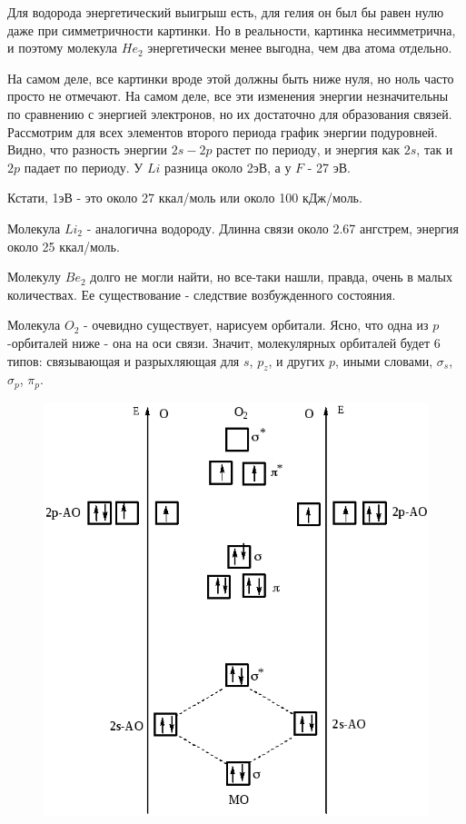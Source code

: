 \documentclass[11pt]{article}
\begin{document}
Для водорода энергетический выигрыш есть, для гелия он был бы равен нулю даже при симметричности картинки. Но в реальности, картинка несимметрична, и поэтому молекула $He_2$ энергетически менее выгодна, чем два атома отдельно.

На самом деле, все картинки вроде этой должны быть ниже нуля, но ноль часто просто не отмечают. На самом деле, все эти изменения энергии незначительны по сравнению с энергией электронов, но их достаточно для образования связей.
Рассмотрим для всех элементов второго периода график энергии подуровней. Видно, что разность энергии $2s-2p$ растет по периоду, и энергия как $2s$, так и $2p$ падает по периоду. У $Li$ разница около 2эВ, а у $F$ - 27 эВ.

Кстати, 1эВ - это около 27 ккал/моль или около 100 кДж/моль.

Молекула $Li_2$ - аналогична водороду. Длинна связи около 2.67 ангстрем, энергия около 25 ккал/моль.

Молекулу $Be_2$ долго не могли найти, но все-таки нашли, правда, очень в малых количествах. Ее существование - следствие возбужденного состояния.

Молекула $O_2$ - очевидно существует, нарисуем орбитали. Ясно, что одна из $p$-орбиталей ниже - она 
на оси связи. Значит, молекулярных орбиталей будет 6 типов: связывающая и разрыхляющая для $s$, $p_z$, и других 
$p$, иными словами, $\sigma_s$, $\sigma_{p}$, $\pi_p$. 

\begin{figure}[htp]
\centering
\includegraphics[scale=.400]{o2-mo.jpg}
\end{figure}
\end{document}
